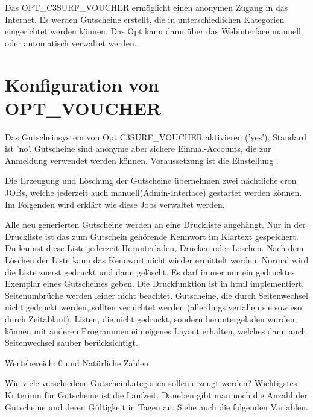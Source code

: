Das OPT\_C3SURF\_VOUCHER ermöglicht einen anonymen Zugang in das Internet. Es werden Gutscheine
erstellt, die in unterschiedlichen Kategorien eingerichtet werden können. Das Opt kann dann über das
Webinterface manuell oder automatisch verwaltet werden.

\section {Konfiguration von OPT\_VOUCHER}

\begin{description}

   
  Das Gutscheinsystem von Opt C3SURF\_VOUCHER aktivieren ('yes'), Standard ist 'no'. Gutscheine sind
  anonyme aber sichere Einmal-Accounts, die zur Anmeldung verwendet werden können.
  Voraussetzung ist die Einstellung .

  Die Erzeugung und Löschung der Gutscheine übernehmen zwei nächtliche cron JOBs, welche jederzeit auch
  manuell(Admin-Interface) gestartet werden können. Im Folgenden wird erklärt wie diese Jobs verwaltet
  werden.

  Alle neu generierten Gutscheine werden an eine Druckliste angehängt. Nur in der Druckliste ist das zum
  Gutschein gehörende Kennwort im Klartext gespeichert. Du kannst diese Liste jederzeit Herunterladen,
  Drucken oder Löschen. Nach dem Löschen der Liste kann das Kennwort nicht wieder ermittelt werden.
  Normal wird die Liste zuerst gedruckt und dann gelöscht. Es darf immer nur ein gedrucktes Exemplar eines
  Gutscheines geben. Die Druckfunktion ist in html implementiert, Seitenumbrüche werden leider nicht beachtet.
  Gutscheine, die durch Seitenwechsel nicht gedruckt werden, sollten vernichtet werden (allerdings verfallen
  sie sowieso durch Zeitablauf). Listen, die nicht gedruckt, sondern heruntergeladen wurden, können mit anderen
  Programmen ein eigenes Layout erhalten, welches dann auch Seitenwechsel sauber berücksichtigt.


    
    Wertebereich: 0 und Natürliche Zahlen
    
  Wie viele verschiedene Gutscheinkategorien sollen erzeugt werden? Wichtigstes Kriterium
  für Gutscheine ist die Laufzeit. Daneben gibt man noch die Anzahl der
  Gutscheine und deren Gültigkeit in Tagen an. Siehe auch die folgenden Variablen.


\end{description}
